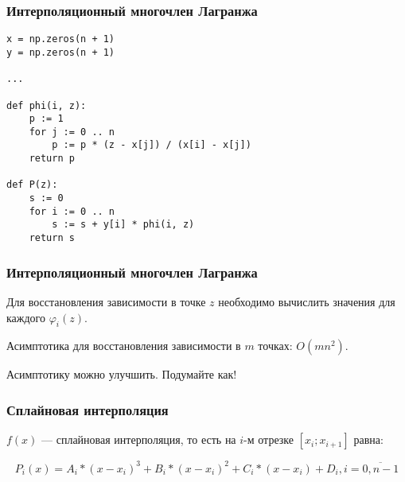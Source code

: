 \documentclass[10pt]{beamer}
\begin{document}
\begin{frame}[fragile]
\frametitle{Интерполяционный многочлен Лагранжа}

\begin{lstlisting}
x = np.zeros(n + 1)
y = np.zeros(n + 1)

...

def phi(i, z):
	p := 1
	for j := 0 .. n
		p := p * (z - x[j]) / (x[i] - x[j])
	return p

def P(z):
	s := 0
	for i := 0 .. n
		s := s + y[i] * phi(i, z)
	return s
\end{lstlisting}
\end{frame}

\begin{frame}[fragile]
\frametitle{Интерполяционный многочлен Лагранжа}

Для восстановления зависимости в точке $z$ необходимо вычислить значения для каждого $\varphi_i(z)$. 

\vfill

Асимптотика для восстановления зависимости в $m$ точках: $O(m n^2)$. 


\vfill

Асимптотику можно улучшить. Подумайте как!
\end{frame}

\begin{frame}[fragile]
\frametitle{Сплайновая интерполяция}

$f(x)$ --- сплайновая интерполяция, то есть на $i$-м отрезке $[x_{i}; x_{i+1}]$ равна:

$$ P_i(x) = A_i * (x - x_{i})^3 + B_i * (x - x_{i})^2 + C_i * (x - x_{i}) + D_i, i = \overline{0,n-1} $$

\begin{center}
\end{center}

\end{frame}
\end{document}
